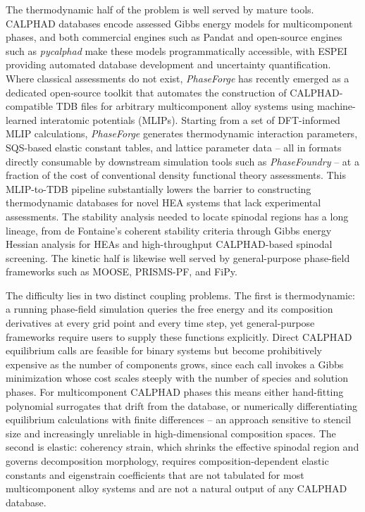 \documentclass[12pt]{article}
\begin{document}
The thermodynamic half of the problem is well served by mature tools. CALPHAD databases encode assessed Gibbs energy models for multicomponent phases, and both commercial engines such as Pandat\cite{cao2009pandat} and open-source engines such as \textit{pycalphad}\cite{otis2017pycalphad} make these models programmatically accessible, with ESPEI providing automated database development and uncertainty quantification.\cite{bocklund2019espei} Where classical assessments do not exist, \textit{PhaseForge}\cite{sariturk2025phaseforge,zhu2025accelerating,zhu2025machine} has recently emerged as a dedicated open-source toolkit that automates the construction of CALPHAD-compatible TDB files for arbitrary multicomponent alloy systems using machine-learned interatomic potentials (MLIPs). Starting from a set of DFT-informed MLIP calculations, \textit{PhaseForge} generates thermodynamic interaction parameters, SQS-based elastic constant tables, and lattice parameter data -- all in formats directly consumable by downstream simulation tools such as \textit{PhaseFoundry} -- at a fraction of the cost of conventional density functional theory assessments.\cite{kunselman2025construction} This MLIP-to-TDB pipeline substantially lowers the barrier to constructing thermodynamic databases for novel HEA systems that lack experimental assessments. The stability analysis needed to locate spinodal regions has a long lineage, from de Fontaine's coherent stability criteria\cite{de1967computer,de1972analysis} through Gibbs energy Hessian analysis for HEAs\cite{morral2021stability} and high-throughput CALPHAD-based spinodal screening.\cite{koneru2022high,kadirvel2022exploration} The kinetic half is likewise well served by general-purpose phase-field frameworks such as MOOSE,\cite{permann2020moose} PRISMS-PF,\cite{dewitt2020prisms} and FiPy.\cite{guyer2009fipy}

The difficulty lies in two distinct coupling problems. The first is thermodynamic: a running phase-field simulation queries the free energy and its composition derivatives at every grid point and every time step, yet general-purpose frameworks require users to supply these functions explicitly. Direct CALPHAD equilibrium calls are feasible for binary systems but become prohibitively expensive as the number of components grows, since each call invokes a Gibbs minimization whose cost scales steeply with the number of species and solution phases. For multicomponent CALPHAD phases this means either hand-fitting polynomial surrogates that drift from the database, or numerically differentiating equilibrium calculations with finite differences -- an approach sensitive to stencil size and increasingly unreliable in high-dimensional composition spaces.\cite{kunselman2024analytically} The second is elastic: coherency strain, which shrinks the effective spinodal region\cite{cahn1961spinodal,de1972analysis} and governs decomposition morphology, requires composition-dependent elastic constants and eigenstrain coefficients that are not tabulated for most multicomponent alloy systems and are not a natural output of any CALPHAD database.
\end{document}
